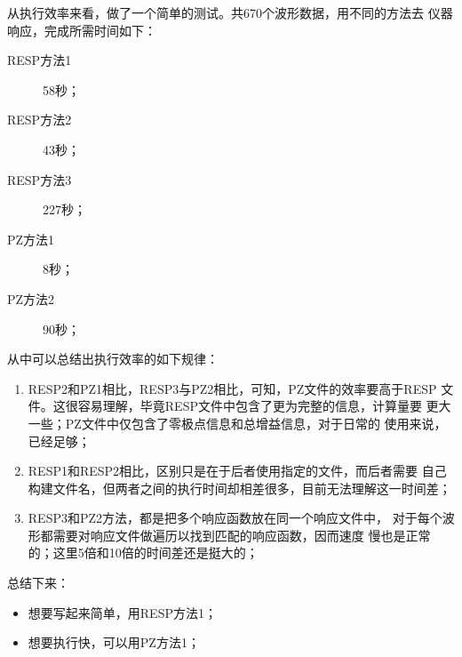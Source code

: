 从执行效率来看，做了一个简单的测试。共670个波形数据，用不同的方法去
仪器响应，完成所需时间如下：
\begin{description}
\item [RESP方法1] 58秒；
\item [RESP方法2] 43秒；
\item [RESP方法3] 227秒；
\item [PZ方法1] 8秒；
\item [PZ方法2] 90秒；
\end{description}
从中可以总结出执行效率的如下规律：
\begin{enumerate}
\item RESP2和PZ1相比，RESP3与PZ2相比，可知，PZ文件的效率要高于RESP
    文件。这很容易理解，毕竟RESP文件中包含了更为完整的信息，计算量要
    更大一些；PZ文件中仅包含了零极点信息和总增益信息，对于日常的
    使用来说，已经足够；
\item RESP1和RESP2相比，区别只是在于后者使用指定的文件，而后者需要
    自己构建文件名，但两者之间的执行时间却相差很多，目前无法理解这一时间差；
\item RESP3和PZ2方法，都是把多个响应函数放在同一个响应文件中，
    对于每个波形都需要对响应文件做遍历以找到匹配的响应函数，因而速度
    慢也是正常的；这里5倍和10倍的时间差还是挺大的；
\end{enumerate}

总结下来：
\begin{itemize}
\item 想要写起来简单，用RESP方法1；
\item 想要执行快，可以用PZ方法1；
\end{itemize}
